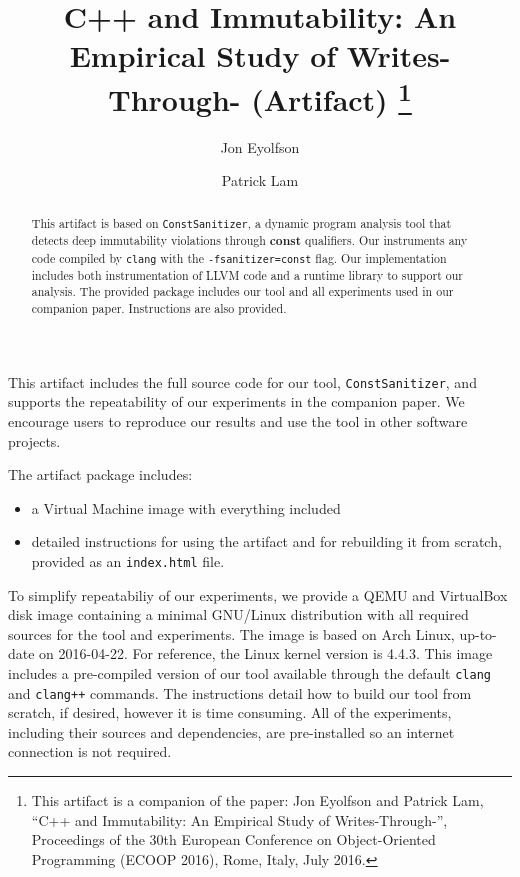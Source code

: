 \documentclass[a4paper,UKenglish]{lipics-v2016}
\title{C++ \const{} and Immutability: An Empirical Study of
       Writes-Through-\const{} (Artifact)
  \footnote{This artifact is a companion of the paper: Jon Eyolfson and Patrick
            Lam, ``C++ \const{} and Immutability: An Empirical Study of
            Writes-Through-\const{}'', Proceedings of the 30th European
            Conference on Object-Oriented Programming (ECOOP 2016), Rome, Italy,
            July 2016.}}
\author[1]{Jon Eyolfson}
\author[2]{Patrick Lam}
\affil[1]{University of Waterloo\\
  Waterloo, ON, Canada\\
  \texttt{jeyolfso@uwaterloo.ca}}
\affil[2]{University of Waterloo\\
  Waterloo ON, Canada\\
  \texttt{patrick.lam@uwaterloo.ca}}
\newcommand{\const}{{\bfseries \ttfamily const}}
\begin{document}
\maketitle

\begin{abstract}
  This artifact is based on {\tt ConstSanitizer}, a dynamic program analysis
  tool that detects deep immutability violations through \const{} qualifiers.
  Our instruments any code compiled by \texttt{clang} with the
  \texttt{-fsanitizer=const} flag. Our implementation includes both
  instrumentation of LLVM code and a runtime library to support our analysis.
  The provided package includes our tool and all experiments used in our
  companion paper. Instructions are also provided.
\end{abstract}

\begin{scope}
  This artifact includes the full source code for our tool,
  \texttt{ConstSanitizer}, and supports the repeatability of our experiments in
  the companion paper. We encourage users to reproduce our results and use the
  tool in other software projects.
\end{scope}

\begin{content}
  The artifact package includes:
  \begin{itemize}
    \item a Virtual Machine image with everything included
    \item detailed instructions for using the artifact and for rebuilding it
          from scratch, provided as an {\tt index.html} file.
  \end{itemize}

  To simplify repeatabiliy of our experiments, we provide a QEMU and VirtualBox
  disk image containing a minimal GNU/Linux distribution with all required
  sources for the tool and experiments. The image is based on Arch Linux,
  up-to-date on 2016-04-22. For reference, the Linux kernel version is 4.4.3.
  This image includes a pre-compiled version of our tool available through the
  default \texttt{clang} and \texttt{clang++} commands. The instructions detail
  how to build our tool from scratch, if desired, however it is time consuming.
  All of the experiments, including their sources and dependencies, are
  pre-installed so an internet connection is not required.
\end{content} 
\end{document}
